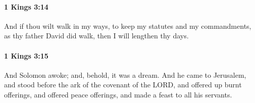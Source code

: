 		\paragraph{1 Kings 3:14} %
			\label{1KINGS-3-14}

			And if thou wilt walk in my ways, to keep my statutes and my commandments, as thy father David did walk, then I will lengthen thy days.


		\paragraph{1 Kings 3:15} %
			\label{1KINGS-3-15}

			And Solomon awoke; and, behold, it was a dream. And he came to Jerusalem, and stood before the ark of the covenant of the LORD, and offered up burnt offerings, and offered peace offerings, and made a feast to all his servants.


